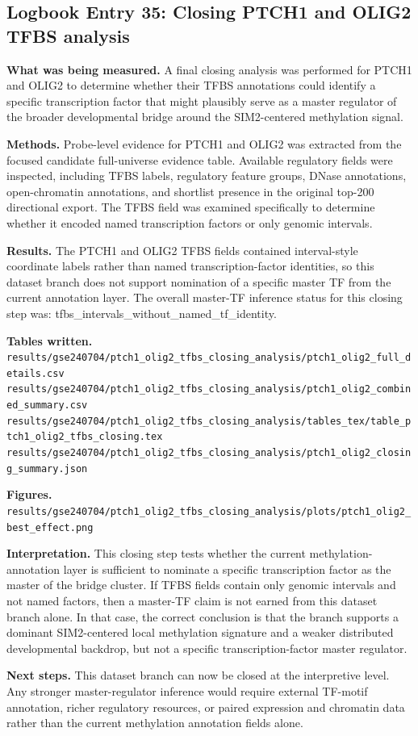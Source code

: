 \subsection*{Logbook Entry 35: Closing PTCH1 and OLIG2 TFBS analysis}

\textbf{What was being measured.}
A final closing analysis was performed for PTCH1 and OLIG2 to determine whether their TFBS annotations could identify a specific transcription factor that might plausibly serve as a master regulator of the broader developmental bridge around the SIM2-centered methylation signal.

\textbf{Methods.}
Probe-level evidence for PTCH1 and OLIG2 was extracted from the focused candidate full-universe evidence table. Available regulatory fields were inspected, including TFBS labels, regulatory feature groups, DNase annotations, open-chromatin annotations, and shortlist presence in the original top-200 directional export. The TFBS field was examined specifically to determine whether it encoded named transcription factors or only genomic intervals.

\textbf{Results.}
The PTCH1 and OLIG2 TFBS fields contained interval-style coordinate labels rather than named transcription-factor identities, so this dataset branch does not support nomination of a specific master TF from the current annotation layer.
The overall master-TF inference status for this closing step was: tfbs\_intervals\_without\_named\_tf\_identity.

\textbf{Tables written.}
\texttt{results/gse240704/ptch1\_olig2\_tfbs\_closing\_analysis/ptch1\_olig2\_full\_details.csv}\\
\texttt{results/gse240704/ptch1\_olig2\_tfbs\_closing\_analysis/ptch1\_olig2\_combined\_summary.csv}\\
\texttt{results/gse240704/ptch1\_olig2\_tfbs\_closing\_analysis/tables\_tex/table\_ptch1\_olig2\_tfbs\_closing.tex}\\
\texttt{results/gse240704/ptch1\_olig2\_tfbs\_closing\_analysis/ptch1\_olig2\_closing\_summary.json}

\textbf{Figures.}
\texttt{results/gse240704/ptch1\_olig2\_tfbs\_closing\_analysis/plots/ptch1\_olig2\_best\_effect.png}

\textbf{Interpretation.}
This closing step tests whether the current methylation-annotation layer is sufficient to nominate a specific transcription factor as the master of the bridge cluster. If TFBS fields contain only genomic intervals and not named factors, then a master-TF claim is not earned from this dataset branch alone. In that case, the correct conclusion is that the branch supports a dominant SIM2-centered local methylation signature and a weaker distributed developmental backdrop, but not a specific transcription-factor master regulator.

\textbf{Next steps.}
This dataset branch can now be closed at the interpretive level. Any stronger master-regulator inference would require external TF-motif annotation, richer regulatory resources, or paired expression and chromatin data rather than the current methylation annotation fields alone.
